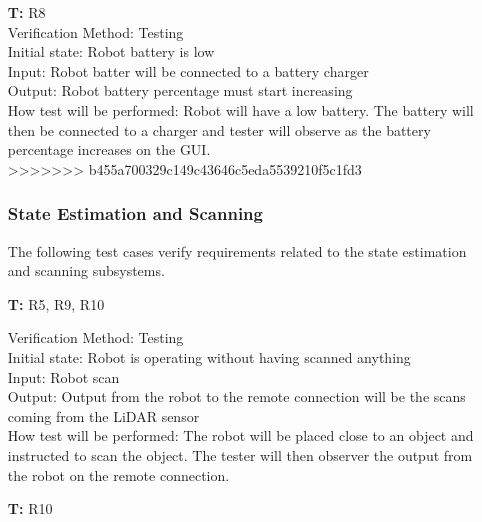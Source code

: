 \documentclass[12pt, titlepage]{article}
\newcounter{tnum} %
\begin{document}
\begin{itemize}
\item[\textbf{T\refstepcounter{tnum}\thetnum:}]{R8\\}
Verification Method: Testing\\
Initial state: Robot battery is low \\
Input: Robot batter will be connected to a battery charger \\
Output: Robot battery percentage must start increasing \\
How test will be performed: Robot will have a low battery. The battery will then be connected to a charger and tester will observe as the battery percentage increases on the GUI.\\
>>>>>>> b455a700329c149c43646c5eda5539210f5c1fd3

\subsubsection{State Estimation and Scanning}

The following test cases verify requirements related to the state estimation and scanning subsystems.

\item[\textbf{T\refstepcounter{tnum}\thetnum:}]{R5, R9, R10\\}

Verification Method: Testing\\
Initial state: Robot is operating without having scanned anything \\
Input: Robot scan\\
Output: Output from the robot to the remote connection will be the scans coming from the LiDAR sensor\\
How test will be performed: The robot will be placed close to an object and instructed to scan the object. The tester will then observer the output from the robot on the remote connection. \\

\item[\textbf{T\refstepcounter{tnum}\thetnum:}]{R10\\}


\end{itemize}
\end{document}
